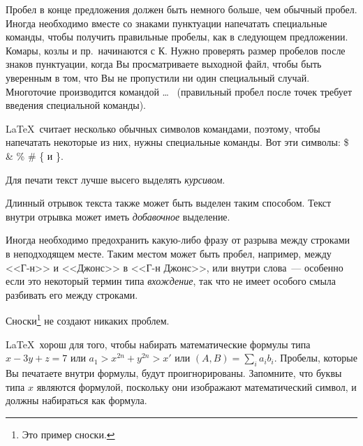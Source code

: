 \documentclass{article}      %
\newcommand{\ip}[2]{(#1, #2)}%
\begin{document}
Пробел в конце предложения должен быть немного больше, чем
обычный пробел.  Иногда необходимо вместе со знаками пунктуации
напечатать специальные команды, чтобы получить правильные
пробелы, как в следующем предложении.
        Комары, козлы и        %
        пр.\ начинаются
        с К\@.                 %
Нужно проверять размер пробелов после знаков пунктуации, когда
Вы просматриваете выходной файл, чтобы быть уверенным в том, что Вы
не пропустили ни один специальный случай.
Многоточие производится командой
       \ldots\               %
(правильный пробел после точек требует введения специальной
команды).

\LaTeX\ считает несколько обычных символов командами,
поэтому, чтобы напечатать некоторые из них,     нужны
специальные команды. Вот эти символы:
       \$ \& \% \# \{ и \}.

Для печати текст лучше высего выделять \emph{курсивом}.

\begin{em}
   Длинный отрывок текста также может быть выделен
   таким способом. Текст внутри отрывка может
   иметь \emph{добавочное} выделение.
\end{em}

Иногда необходимо предохранить какую-либо фразу от разрыва
между строками в неподходящем месте. Таким местом может
быть пробел, например, между <<Г-н>> и <<Джонс>> в
        <<Г-н Джонс>>,    %
или внутри слова~--- особенно если это некоторый термин типа
        \mbox{\emph{вхождение}},
так что не имеет особого смыла разбивать его между строками.

Сноски\footnote{Это пример сноски.} не создают никаких проблем.

\LaTeX\ хорош для того, чтобы набирать математические формулы
типа
       \( x-3y + z = 7 \)
или
       \( a_{1} > x^{2n} + y^{2n} > x' \)
или
       \( \ip{A}{B} = \sum_{i} a_{i} b_{i} \).
Пробелы, которые Вы печатаете внутри формулы, будут
проигнорированы. Запомните, что буквы типа
       $x$                   %
являются формулой, поскольку они изображают математический символ,
и должны набираться как формула.
\end{document}
